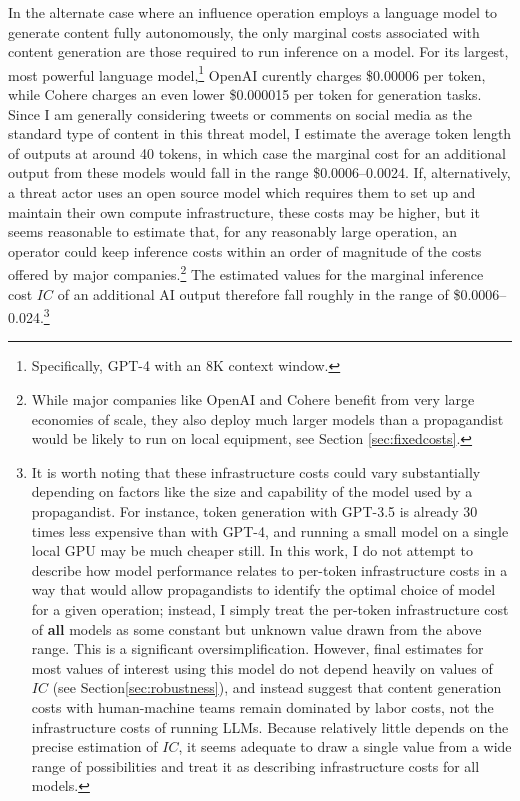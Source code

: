 \documentclass{article}
\begin{document}
In the alternate case where an influence operation employs a language model to generate content fully autonomously, the only marginal costs associated with content generation are those required to run inference on a model. For its largest, most powerful language model,\footnote{Specifically, GPT-4 with an 8K context window.} OpenAI curently charges \$0.00006 per token, while Cohere charges an even lower \$0.000015 per token for generation tasks. \cite{cohereapi, openaiapi} Since I am generally considering tweets or comments on social media as the standard type of content in this threat model, I estimate the average token length of outputs at around 40 tokens, in which case the marginal cost for an additional output from these models would fall in the range \$0.0006–0.0024. If, alternatively, a threat actor uses an open source model which requires them to set up and maintain their own compute infrastructure, these costs may be higher, but it seems reasonable to estimate that, for any reasonably large operation, an operator could keep inference costs within an order of magnitude of the costs offered by major companies.\footnote{While major companies like OpenAI and Cohere benefit from very large economies of scale, they also deploy much larger models than a propagandist would be likely to run on local equipment, see Section \ref{sec:fixedcosts}.} The estimated values for the marginal inference cost $IC$ of an additional AI output therefore fall roughly in the range of \$0.0006–0.024.\footnote{It is worth noting that these infrastructure costs could vary substantially depending on factors like the size and capability of the model used by a propagandist. For instance, token generation with GPT-3.5 is already 30 times less expensive than with GPT-4, and running a small model on a single local GPU may be much cheaper still. In this work, I do not attempt to describe how model performance relates to per-token infrastructure costs in a way that would allow propagandists to identify the optimal choice of model for a given operation; instead, I simply treat the per-token infrastructure cost of \textbf{all} models as some constant but unknown value drawn from the above range. This is a significant oversimplification. However, final estimates for most values of interest using this model do not depend heavily on values of $IC$ (see Section\ref{sec:robustness}), and instead suggest that content generation costs with human-machine teams remain dominated by labor costs, not the infrastructure costs of running LLMs. Because relatively little depends on the precise estimation of $IC$, it seems adequate to draw a single value from a wide range of possibilities and treat it as describing infrastructure costs for all models.}
\end{document}
